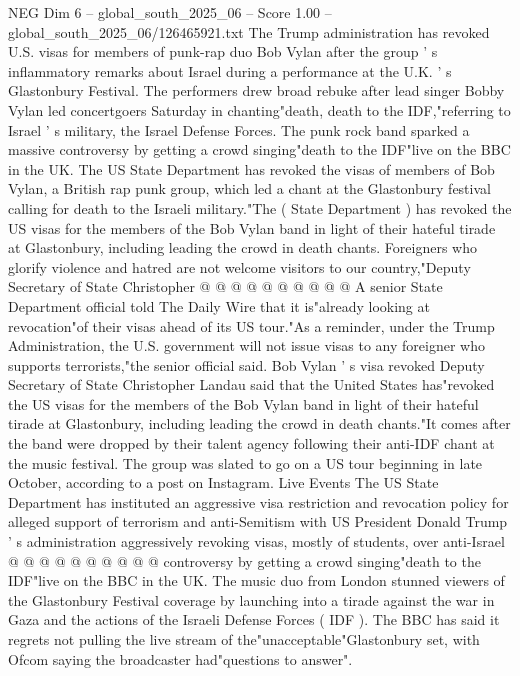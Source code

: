 \begin{textsample}{NEG Dim 6 – global\_south\_2025\_06 – Score 1.00 – global\_south\_2025\_06/126465921.txt}  \label{ex:f6_neg_441}
The Trump administration has revoked U.S. visas for members of punk-rap duo Bob Vylan after the group ' s inflammatory remarks about Israel during a performance at the U.K. ' s Glastonbury Festival.
The performers drew broad rebuke after lead singer Bobby Vylan led concertgoers Saturday in chanting"death, death to the IDF,"referring to Israel ' s military, the Israel Defense Forces.
The punk rock band sparked a massive controversy by getting a crowd singing"death to the IDF"live on the BBC in the UK.
The US State Department has revoked the visas of members of Bob Vylan, a British rap punk group, which led a chant at the Glastonbury festival calling for death to the Israeli military."The ( State Department ) has revoked the US visas for the members of the Bob Vylan band in light of their hateful tirade at Glastonbury, including leading the crowd in death chants.
Foreigners who glorify violence and hatred are not welcome visitors to our country,"Deputy Secretary of State Christopher @ @ @ @ @ @ @ @ @ @ A senior State Department official told The Daily Wire that it is"already looking at revocation"of their visas ahead of its US tour."As a reminder, under the Trump Administration, the U.S. government will not issue visas to any foreigner who supports terrorists,"the senior official said.
Bob Vylan ' s visa revoked Deputy Secretary of State Christopher Landau said that the United States has"revoked the US visas for the members of the Bob Vylan band in light of their hateful tirade at Glastonbury, including leading the crowd in death chants."It comes after the band were dropped by their talent agency following their anti-IDF chant at the music festival.
The group was slated to go on a US tour beginning in late October, according to a post on Instagram.
Live Events The US State Department has instituted an aggressive visa restriction and revocation policy for alleged support of terrorism and anti-Semitism with US President Donald Trump ' s administration aggressively revoking visas, mostly of students, over anti-Israel @ @ @ @ @ @ @ @ @ @ controversy by getting a crowd singing"death to the IDF"live on the BBC in the UK.
The music duo from London stunned viewers of the Glastonbury Festival coverage by launching into a tirade against the war in Gaza and the actions of the Israeli Defense Forces ( IDF ).
The BBC has said it regrets not pulling the live stream of the"unacceptable"Glastonbury set, with Ofcom saying the broadcaster had"questions to answer".

\end{textsample}
